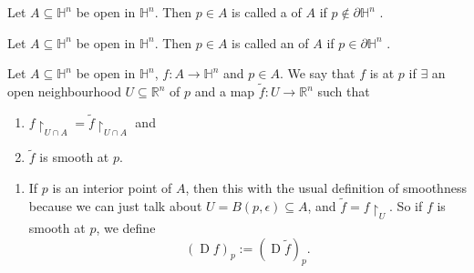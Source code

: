 \documentclass[notoc,notitlepage]{tufte-book}
\DeclareMathOperator{\D}{D}
\begin{document}
\begin{defn}\label{defn:interior_point_in_the_half_space}
  Let $A \subseteq \mathbb{H}^n$ be open in $\mathbb{H}^n$. Then $p \in A$ is
  called a  of $A$ if $p \notin \partial \mathbb{H}^n$
  .
\end{defn}

\begin{defn}\label{defn:boundary_point_in_the_half_space}
  Let $A \subseteq \mathbb{H}^n$ be open in $\mathbb{H}^n$. Then $p \in A$ is
  called an  of $A$ if $p \in \partial \mathbb{H}^n$
  .
\end{defn}

\begin{defn}\label{defn:smooth_functions_in_the_half_space}
  Let $A \subseteq \mathbb{H}^n$ be open in $\mathbb{H}^n$, $f : A \to
  \mathbb{H}^n$ and $p \in A$. We say that $f$ is  at $p$ if
  $\exists$ an open neighbourhood $U \subseteq \mathbb{R}^n$ of $p$ and a map
  $\tilde{f} : U \to \mathbb{R}^n$ such that
  \begin{enumerate}
    \item $f \restriction_{U \cap A} = \tilde{f} \restriction_{U \cap A}$ and
    \item $\tilde{f}$ is smooth at $p$.
  \end{enumerate}
\end{defn}

\begin{remark}
  \begin{enumerate}
    \item If $p$ is an interior point of $A$, then this  with
      the usual definition of smoothness because we can just talk about $U =
      B(p, \epsilon) \subseteq A$, and $\tilde{f} = f \restriction_{U}$. So if
      $f$ is smooth at $p$, we define
      \begin{equation*}
        (\D f)_p := (\D \tilde{f})_p.
      \end{equation*}
  \end{enumerate}
\end{remark}
\end{document}
